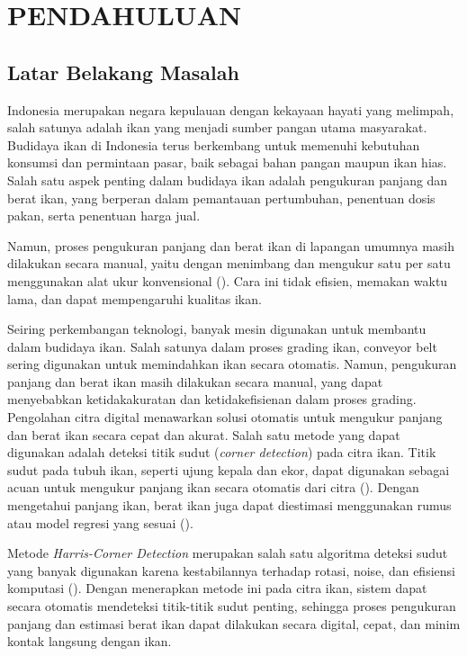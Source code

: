 
\chapter{PENDAHULUAN}

\section{Latar Belakang Masalah}

Indonesia merupakan negara kepulauan dengan kekayaan hayati yang melimpah, salah satunya adalah ikan yang menjadi sumber pangan utama masyarakat. Budidaya ikan di Indonesia terus berkembang untuk memenuhi kebutuhan konsumsi dan permintaan pasar, baik sebagai bahan pangan maupun ikan hias. Salah satu aspek penting dalam budidaya ikan adalah pengukuran panjang dan berat ikan, yang berperan dalam pemantauan pertumbuhan, penentuan dosis pakan, serta penentuan harga jual.

Namun, proses pengukuran panjang dan berat ikan di lapangan umumnya masih dilakukan secara manual, yaitu dengan menimbang dan mengukur satu per satu menggunakan alat ukur konvensional (\cite{Amri2020}). Cara ini tidak efisien, memakan waktu lama, dan dapat mempengaruhi kualitas ikan.

Seiring perkembangan teknologi, banyak mesin digunakan untuk membantu dalam budidaya ikan. Salah satunya dalam proses grading ikan, conveyor belt sering digunakan untuk memindahkan ikan secara otomatis. Namun, pengukuran panjang dan berat ikan masih dilakukan secara manual, yang dapat menyebabkan ketidakakuratan dan ketidakefisienan dalam proses grading.
Pengolahan citra digital menawarkan solusi otomatis untuk mengukur panjang dan berat ikan secara cepat dan akurat. Salah satu metode yang dapat digunakan adalah deteksi titik sudut (\emph{corner detection}) pada citra ikan. Titik sudut pada tubuh ikan, seperti ujung kepala dan ekor, dapat digunakan sebagai acuan untuk mengukur panjang ikan secara otomatis dari citra (\cite{Harris2013}). Dengan mengetahui panjang ikan, berat ikan juga dapat diestimasi menggunakan rumus atau model regresi yang sesuai (\cite{Diansari2013}).

Metode \emph{Harris-Corner Detection} merupakan salah satu algoritma deteksi sudut yang banyak digunakan karena kestabilannya terhadap rotasi, noise, dan efisiensi komputasi (\cite{Harris2013}). Dengan menerapkan metode ini pada citra ikan, sistem dapat secara otomatis mendeteksi titik-titik sudut penting, sehingga proses pengukuran panjang dan estimasi berat ikan dapat dilakukan secara digital, cepat, dan minim kontak langsung dengan ikan.

